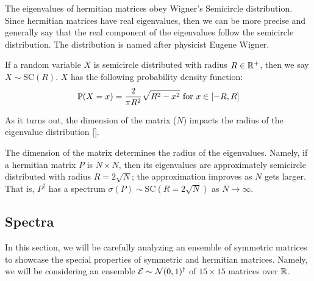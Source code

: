 The eigenvalues of hermitian matrices obey Wigner's Semicircle distribution.
Since hermitian matrices have real eigenvalues, then we can be more precise and generally say that the real component of the eigenvalues follow the semicircle distribution.
The distribution is named after physicist Eugene Wigner.

\begin{definition}
If a random variable $X$ is semicircle distributed with radius $R \in \mathbb{R}^+$, then we say $X \sim \text{SC}(R)$. $X$ has the following probability density function:
$$\mathbb{P}(X = x) = \frac{2}{\pi R^2} \sqrt{R^2 - x^2} \text{ for } x \in [-R, R]$$
\end{definition}

As it turns out, the dimension of the matrix ($N$) impacts the radius of the eigenvalue distribution [\cite{tao}].

\begin{remark}
The dimension of the matrix determines the radius of the eigenvalues.
Namely, if a hermitian matrix $P$ is $N \times N$, then its eigenvalues are approximately semicircle distributed with radius $R = 2\sqrt{N}$; the approximation improves as $N$ gets larger.
That is, $P^{\dagger}$ has a spectrum $\sigma({P}) \sim \text{SC}(R = 2\sqrt{N})$ as $N \to \infty$.
\end{remark}



\newpage
\subsection{Spectra}

In this section, we will be carefully analyzing an ensemble of symmetric matrices to showcase
the special properties of symmetric and hermitian matrices.
Namely, we will be considering an ensemble $\mathcal{E} \sim \mathcal{N}(0,1)^\dagger$ of $15 \times 15$ matrices over $\mathbb{R}$.


